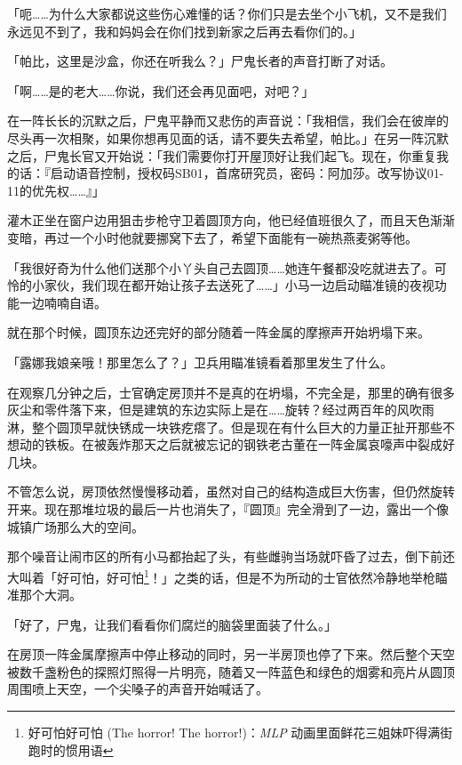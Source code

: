 「呃……为什么大家都说这些伤心难懂的话？你们只是去坐个小飞机，又不是我们永远见不到了，我和妈妈会在你们找到新家之后再去看你们的。」

「帕比，这里是沙盒，你还在听我么？」尸鬼长者的声音打断了对话。

「啊……是的老大……你说，我们还会再见面吧，对吧？」

在一阵长长的沉默之后，尸鬼平静而又悲伤的声音说：「我相信，我们会在彼岸的尽头再一次相聚，如果你想再见面的话，请不要失去希望，帕比。」在另一阵沉默之后，尸鬼长官又开始说：「我们需要你打开屋顶好让我们起飞。现在，你重复我的话：『启动语音控制，授权码SB01，首席研究员，密码：阿加莎。改写协议01-11的优先权……』」

\horizonline


灌木正坐在窗户边用狙击步枪守卫着圆顶方向，他已经值班很久了，而且天色渐渐变暗，再过一个小时他就要挪窝下去了，希望下面能有一碗热燕麦粥等他。

「我很好奇为什么他们送那个小丫头自己去圆顶……她连午餐都没吃就进去了。可怜的小家伙，我们现在都开始让孩子去送死了……」小马一边启动瞄准镜的夜视功能一边喃喃自语。

就在那个时候，圆顶东边还完好的部分随着一阵金属的摩擦声开始坍塌下来。

「露娜我娘亲哦！那里怎么了？」卫兵用瞄准镜看着那里发生了什么。

在观察几分钟之后，士官确定房顶并不是真的在坍塌，不完全是，那里的确有很多灰尘和零件落下来，但是建筑的东边实际上是在……旋转？经过两百年的风吹雨淋，整个圆顶早就快锈成一块铁疙瘩了。但是现在有什么巨大的力量正扯开那些不想动的铁板。在被轰炸那天之后就被忘记的钢铁老古董在一阵金属哀嚎声中裂成好几块。

不管怎么说，房顶依然慢慢移动着，虽然对自己的结构造成巨大伤害，但仍然旋转开来。现在那堆垃圾的最后一片也消失了，『圆顶』完全滑到了一边，露出一个像城镇广场那么大的空间。

那个噪音让闹市区的所有小马都抬起了头，有些雌驹当场就吓昏了过去，倒下前还大叫着「好可怕，好可怕\footnote{好可怕好可怕 (The horror! The horror!)：\emph{MLP} 动画里面鲜花三姐妹吓得满街跑时的惯用语}！」之类的话，但是不为所动的士官依然冷静地举枪瞄准那个大洞。

「好了，尸鬼，让我们看看你们腐烂的脑袋里面装了什么。」

在房顶一阵金属摩擦声中停止移动的同时，另一半房顶也停了下来。然后整个天空被数千盏粉色的探照灯照得一片明亮，随着又一阵蓝色和绿色的烟雾和亮片从圆顶周围喷上天空，一个尖嗓子的声音开始喊话了。

